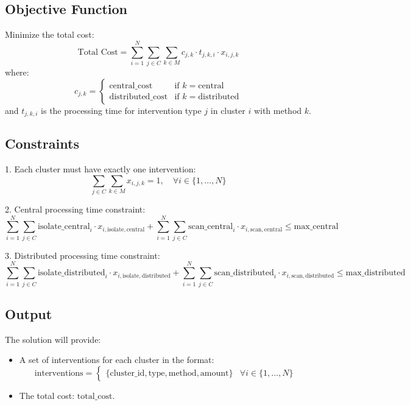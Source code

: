 \documentclass{article}
\begin{document}
\subsection*{Objective Function}
Minimize the total cost:
\[
\text{Total Cost} = \sum_{i=1}^{N} \sum_{j \in C} \sum_{k \in M} c_{j,k} \cdot t_{j,k,i} \cdot x_{i,j,k}
\]
where:
\[
c_{j,k} =
\begin{cases}
\text{central\_cost} & \text{if } k = \text{central} \\
\text{distributed\_cost} & \text{if } k = \text{distributed}
\end{cases}
\]
and \( t_{j,k,i} \) is the processing time for intervention type \( j \) in cluster \( i \) with method \( k \).

\subsection*{Constraints}
1. Each cluster must have exactly one intervention:
\[
\sum_{j \in C} \sum_{k \in M} x_{i,j,k} = 1, \quad \forall i \in \{1, \ldots, N\}
\]

2. Central processing time constraint:
\[
\sum_{i=1}^{N} \sum_{j \in C} \text{isolate\_central}_i \cdot x_{i,\text{isolate},\text{central}} + \sum_{i=1}^{N} \sum_{j \in C} \text{scan\_central}_i \cdot x_{i,\text{scan},\text{central}} \leq \text{max\_central}
\]

3. Distributed processing time constraint:
\[
\sum_{i=1}^{N} \sum_{j \in C} \text{isolate\_distributed}_i \cdot x_{i,\text{isolate},\text{distributed}} + \sum_{i=1}^{N} \sum_{j \in C} \text{scan\_distributed}_i \cdot x_{i,\text{scan},\text{distributed}} \leq \text{max\_distributed}
\]

\subsection*{Output}
The solution will provide:
\begin{itemize}
    \item A set of interventions for each cluster in the format:
    \[
    \text{interventions} =
    \begin{cases}
        \{ \text{cluster\_id}, \text{type}, \text{method}, \text{amount} \} & \forall i \in \{1, \ldots, N\}
    \end{cases}
    \]
    \item The total cost: \( \text{total\_cost} \).
\end{itemize}
\end{document}
